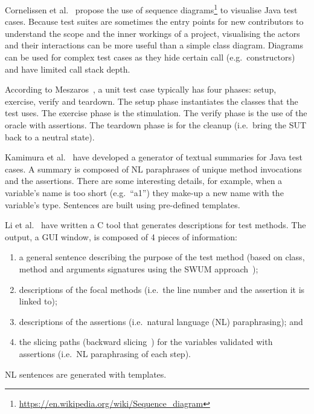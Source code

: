 \documentclass[a4paper,11pt]{sdm_internship}
\newcommand{\CS}{C\nolinebreak\hspace{-.05em}\raisebox{.6ex}{\scriptsize\bf \#}}
\theoremstyle{definition}
\begin{document}
Cornelissen et al.~\cite{cornelissen2007visualizing} propose the use of sequence diagrams\footnote{\url{https://en.wikipedia.org/wiki/Sequence_diagram}} to visualise Java test cases.
Because test suites are sometimes the entry points for new contributors to understand the scope and the inner workings of a project, visualising the actors and their interactions can be more useful than a simple class diagram.
Diagrams can be used for complex test cases as they hide certain call (e.g.\ constructors) and have limited call stack depth.

According to Meszaros~\cite{meszaros2007xunit}, a unit test case typically has four phases: setup, exercise, verify and teardown.
The setup phase instantiates the classes that the test uses.
The exercise phase is the stimulation.
The verify phase is the use of the oracle with assertions.
The teardown phase is for the cleanup (i.e.\ bring the SUT back to a neutral state).

Kamimura et al.~\cite{kamimura2013towards} have developed a generator of textual summaries for Java test cases.
A summary is composed of NL paraphrases of unique method invocations and the assertions.
There are some interesting details, for example, when a variable's name is too short (e.g.\ ``a1'') they make-up a new name with the variable's type.
Sentences are built using pre-defined templates.

Li et al.~\cite{li2016automatically} have written a \CS{} tool that generates descriptions for test methods.
The output, a GUI window, is composed of 4 pieces of information:
\begin{enumerate}
  \item a general sentence describing the purpose of the test method (based on class, method and arguments signatures using the SWUM approach~\cite{herbert2016swummary});
  \item descriptions of the focal methods (i.e.\ the line number and the assertion it is linked to);
  \item descriptions of the assertions (i.e.\ natural language (NL) paraphrasing); and
  \item the slicing paths (backward slicing~\cite{jhala2005path}) for the variables validated with assertions (i.e.\ NL paraphrasing of each step).
\end{enumerate}
NL sentences are generated with templates.
\end{document}
